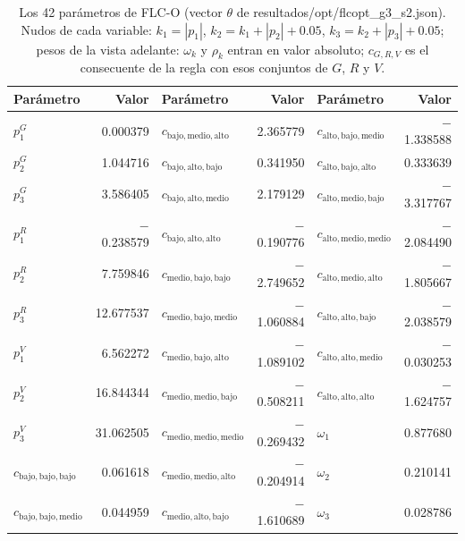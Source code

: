\begin{table}[!t]
\centering
\caption{Los 42 par\'ametros de FLC-O (vector $\theta$ de resultados/opt/flcopt\_g3\_s2.json). Nudos de cada variable: $k_1=|p_1|$, $k_2=k_1+|p_2|+0.05$, $k_3=k_2+|p_3|+0.05$; pesos de la vista adelante: $\omega_k$ y $\rho_k$ entran en valor absoluto; $c_{G,R,V}$ es el consecuente de la regla con esos conjuntos de $G$, $R$ y $V$.}
\label{tab:sparametros}
\scriptsize
\renewcommand{\arraystretch}{1.3}
\begin{tabular}{@{}lrlrlr@{}}
\toprule
Par\'ametro & Valor & Par\'ametro & Valor & Par\'ametro & Valor \\
\midrule
$p_{1}^{G}$ & 0.000379 & $c_{\text{bajo},\text{medio},\text{alto}}$ & 2.365779 & $c_{\text{alto},\text{bajo},\text{medio}}$ & $-$1.338588 \\
$p_{2}^{G}$ & 1.044716 & $c_{\text{bajo},\text{alto},\text{bajo}}$ & 0.341950 & $c_{\text{alto},\text{bajo},\text{alto}}$ & 0.333639 \\
$p_{3}^{G}$ & 3.586405 & $c_{\text{bajo},\text{alto},\text{medio}}$ & 2.179129 & $c_{\text{alto},\text{medio},\text{bajo}}$ & $-$3.317767 \\
$p_{1}^{R}$ & $-$0.238579 & $c_{\text{bajo},\text{alto},\text{alto}}$ & $-$0.190776 & $c_{\text{alto},\text{medio},\text{medio}}$ & $-$2.084490 \\
$p_{2}^{R}$ & 7.759846 & $c_{\text{medio},\text{bajo},\text{bajo}}$ & $-$2.749652 & $c_{\text{alto},\text{medio},\text{alto}}$ & $-$1.805667 \\
$p_{3}^{R}$ & 12.677537 & $c_{\text{medio},\text{bajo},\text{medio}}$ & $-$1.060884 & $c_{\text{alto},\text{alto},\text{bajo}}$ & $-$2.038579 \\
$p_{1}^{V}$ & 6.562272 & $c_{\text{medio},\text{bajo},\text{alto}}$ & $-$1.089102 & $c_{\text{alto},\text{alto},\text{medio}}$ & $-$0.030253 \\
$p_{2}^{V}$ & 16.844344 & $c_{\text{medio},\text{medio},\text{bajo}}$ & $-$0.508211 & $c_{\text{alto},\text{alto},\text{alto}}$ & $-$1.624757 \\
$p_{3}^{V}$ & 31.062505 & $c_{\text{medio},\text{medio},\text{medio}}$ & $-$0.269432 & $\omega_{1}$ & 0.877680 \\
$c_{\text{bajo},\text{bajo},\text{bajo}}$ & 0.061618 & $c_{\text{medio},\text{medio},\text{alto}}$ & $-$0.204914 & $\omega_{2}$ & 0.210141 \\
$c_{\text{bajo},\text{bajo},\text{medio}}$ & 0.044959 & $c_{\text{medio},\text{alto},\text{bajo}}$ & $-$1.610689 & $\omega_{3}$ & 0.028786 \\

\end{tabular}
\end{table}
